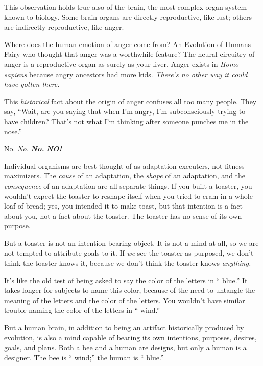 {
 This observation holds true also of the brain, the most complex
organ system known to biology. Some brain organs are directly
reproductive, like lust; others are indirectly reproductive, like
anger.}

{
 Where does the human emotion of anger come from? An
Evolution-of-Humans Fairy who thought that anger was a worthwhile
feature? The neural circuitry of anger is a reproductive organ as
surely as your liver. Anger exists in \textit{Homo sapiens} because
angry ancestors had more kids. \textit{There's no other
way it could have gotten there.}}

{
 This \textit{historical} fact about the origin of anger confuses
all too many people. They say, ``Wait, are you saying
that when I'm angry, I'm subconsciously
trying to have children? That's not what
I'm thinking after someone punches me in the
nose.''}

{
 No. \textit{No.} \textbf{\textit{No.}} \textbf{\textit{NO!}}}

{
 Individual organisms are best thought of as adaptation-executers,
not fitness-maximizers. The \textit{cause} of an adaptation, the
\textit{shape} of an adaptation, and the \textit{consequence} of an
adaptation are all separate things. If you built a toaster, you
wouldn't expect the toaster to reshape itself when you
tried to cram in a whole loaf of bread; yes, you intended it to make
toast, but that intention is a fact about you, not a fact about the
toaster. The toaster has no sense of its own purpose.}

{
 But a toaster is not an intention-bearing object. It is not a mind
at all, so we are not tempted to attribute goals to it. If \textit{we}
see the toaster as purposed, we don't think the toaster
knows it, because we don't think the toaster knows
\textit{anything.}}

{
 It's like the old test of being asked to say the
color of the letters in ``{\color{red} blue}.'' It
takes longer for subjects to name this color, because of the need to
untangle the meaning of the letters and the color of the letters. You
wouldn't have similar trouble naming the color of the
letters in ``{\color{green} wind}.''}

{
 But a human brain, in addition to being an artifact historically
produced by evolution, is also a mind capable of bearing its own
intentions, purposes, desires, goals, and plans. Both a bee and a human
are designs, but only a human is a designer. The bee is
``{\color{green} wind};'' the human is
``{\color{red} blue}.''}

